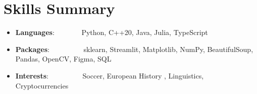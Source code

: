 \documentclass[a4paper,11pt]{extarticle}
\newcommand{\resumeSkillItem}[2]{
	\item\small{
		\textbf{#1}{: #2 \vspace{-2pt}}
	}
}
\newcommand{\resumeSubItem}[2]{\resumeSkillItem{#1}{#2}\vspace{-5pt}}
\newcommand{\resumeSubHeadingListStart}{
    \begin{itemize}[leftmargin=0.15in,label={}]}
\newcommand{\resumeSubHeadingListEnd}{\end{itemize}}
\begin{document}
\section{Skills Summary}
	\resumeSubHeadingListStart
		\resumeSubItem{Languages}
            {\hspace{0.2mm}~~~~~~~Python, C++20, Java, Julia, TypeScript}
		\resumeSubItem{Packages}
            {\hspace{0.2mm}~~~~~~~~~sklearn, Streamlit, Matplotlib, NumPy, BeautifulSoup, Pandas, OpenCV, Figma, SQL}
            \resumeSubItem{Interests}
            {\hspace{0.2mm}~~~~~~~~~Soccer, European History , Linguistics, Cryptocurrencies}            
	\resumeSubHeadingListEnd
\end{document}
